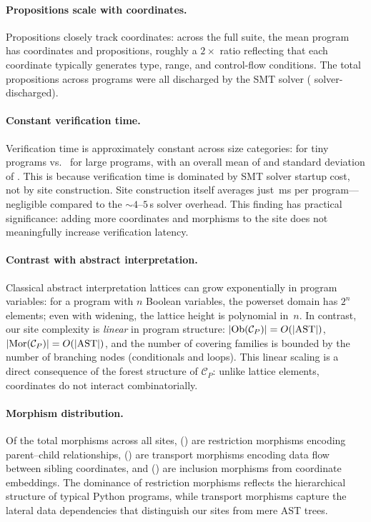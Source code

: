 \documentclass[11pt]{article}
\begin{document}
\paragraph{Propositions scale with coordinates.}
Propositions closely track coordinates: across the full suite, the mean
program has \compCoordsMean{} coordinates and \compPropsMean{}
propositions, roughly a $2\times$ ratio reflecting that each coordinate
typically generates type, range, and control-flow conditions.
The total \compPropsSum{} propositions across \compTotalPrograms{}
programs were all discharged by the SMT solver
(\compTrustSolverdischargedPct{} solver-discharged).

\paragraph{Constant verification time.}
Verification time is approximately constant across size categories:
\compTinyMeanTime{} for tiny programs vs.\ \compLargeMeanTime{} for
large programs, with an overall mean of \compTimeMean{} and standard
deviation of \compTimeStdev.  This is because verification time is
dominated by SMT solver startup cost, not by site construction.
Site construction itself averages just \compSiteMeanBuildMs\,ms per
program---negligible compared to the ${\sim}4$--$5$\,s solver overhead.
This finding has practical significance: adding more coordinates and
morphisms to the site does not meaningfully increase verification
latency.

\paragraph{Contrast with abstract interpretation.}
Classical abstract interpretation lattices can grow exponentially in
program variables: for a program with $n$ Boolean variables, the
powerset domain has $2^n$ elements; even with widening, the lattice
height is polynomial in~$n$.  In contrast, our site complexity is
\emph{linear} in program structure:
$|\mathrm{Ob}(\mathcal{C}_P)| = O(|\mathrm{AST}|)$,
$|\mathrm{Mor}(\mathcal{C}_P)| = O(|\mathrm{AST}|)$,
and the number of covering families is bounded by the number of
branching nodes (conditionals and loops).  This linear scaling is a
direct consequence of the forest structure of $\mathcal{C}_P$:
unlike lattice elements, coordinates do not interact combinatorially.

\paragraph{Morphism distribution.}
Of the \compMorphTotal{} total morphisms across all sites,
\compMorphRestriction{} (\compMorphRestrictionPct) are restriction
morphisms encoding parent--child relationships,
\compMorphTransport{} (\compMorphTransportPct) are transport morphisms
encoding data flow between sibling coordinates, and
\compMorphInclusion{} (\compMorphInclusionPct) are inclusion morphisms
from coordinate embeddings.
The dominance of restriction morphisms reflects the hierarchical
structure of typical Python programs, while transport morphisms capture
the lateral data dependencies that distinguish our sites from mere
AST trees.
\end{document}
